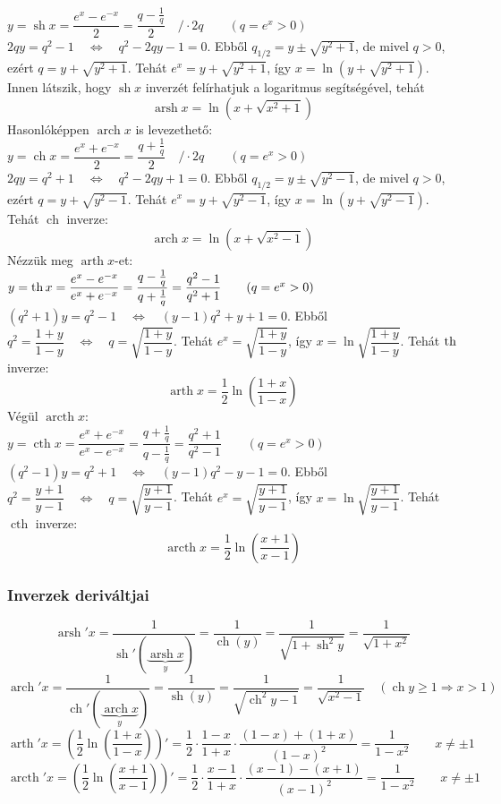 \documentclass[a4paper,12pt,twoside]{book}
\DeclareMathOperator{\sh}{sh} %
\DeclareMathOperator{\ch}{ch} %
\renewcommand{\th}{\qopname\relax o{th}}
\DeclareMathOperator{\cth}{cth}
\DeclareMathOperator{\arsh}{arsh}
\DeclareMathOperator{\arch}{arch}
\DeclareMathOperator{\arth}{arth}
\DeclareMathOperator{\arcth}{arcth}
\theoremstyle{break}
\theoremstyle{plain}
\begin{document}
$y = \sh x = \dfrac{e^x-e^{-x}}{2} = \dfrac{q-\frac{1}{q}}{2} \quad /\cdot 2q \qquad (q=e^x >0)$\\
$2qy = q^2-1 \quad \Leftrightarrow \quad q^2-2qy-1=0$. Ebből $q_{1/2} = y\pm\sqrt{y^2+1}$, de mivel $q>0$, ezért $q=y+\sqrt{y^2+1}$. Tehát $e^x = y+\sqrt{y^2+1}$, így $x = \ln(y+\sqrt{y^2+1})$.\\
Innen látszik, hogy $\sh x$ inverzét felírhatjuk a logaritmus segítségével, tehát
\[\arsh x = \ln(x+\sqrt{x^2+1})\]
Hasonlóképpen $\arch x$ is levezethető:\\
$y = \ch x = \dfrac{e^x+e^{-x}}{2} = \dfrac{q+\frac{1}{q}}{2} \quad /\cdot 2q \qquad (q=e^x >0)$\\
$2qy = q^2+1 \quad \Leftrightarrow \quad q^2-2qy+1=0$. Ebből $q_{1/2} = y\pm\sqrt{y^2-1}$, de mivel $q>0$, ezért $q=y+\sqrt{y^2-1}$. Tehát $e^x = y+\sqrt{y^2-1}$, így $x = \ln(y+\sqrt{y^2-1})$. Tehát $\ch$ inverze:\\
\[\arch x = \ln(x + \sqrt{x^2-1})\]
Nézzük meg $\arth x$-et:\\
$y = \th x = \dfrac{e^x-e^{-x}}{e^x+e^{-x}} = \dfrac{q-\frac{1}{q}}{q+\frac{1}{q}} = \dfrac{q^2-1}{q^2+1} \qquad (q=e^x >0)$\\
$(q^2+1)y = q^2-1 \quad \Leftrightarrow \quad (y-1)q^2+y+1=0$. Ebből $q^2 = \dfrac{1+y}{1-y} \quad \Leftrightarrow \quad q=\sqrt{\dfrac{1+y}{1-y}}$. Tehát $e^x = \sqrt{\dfrac{1+y}{1-y}}$, így $x = \ln \sqrt{\dfrac{1+y}{1-y}}$. Tehát $\th$ inverze:\\
\[\arth x = \frac{1}{2} \ln \left(\frac{1+x}{1-x}\right)\]
Végül $\arcth x$:\\
$y = \cth x = \dfrac{e^x+e^{-x}}{e^x-e^{-x}} = \dfrac{q+\frac{1}{q}}{q-\frac{1}{q}} = \dfrac{q^2+1}{q^2-1} \qquad (q=e^x >0)$\\
$(q^2-1)y = q^2+1 \quad \Leftrightarrow \quad (y-1)q^2-y-1=0$. Ebből $q^2 = \dfrac{y+1}{y-1} \quad \Leftrightarrow \quad q=\sqrt{\dfrac{y+1}{y-1}}$. Tehát $e^x = \sqrt{\dfrac{y+1}{y-1}}$, így $x = \ln \sqrt{\dfrac{y+1}{y-1}}$. Tehát $\cth$ inverze:\\
\[\arcth x = \frac{1}{2} \ln \left(\frac{x+1}{x-1}\right)\]

\subsubsection{Inverzek deriváltjai}

\[\arsh' x = \frac{1}{\sh'(\underbrace{\arsh x}_{y})} = \frac{1}{\ch(y)} = \frac{1}{\sqrt{1+\sh^2 y}} = \frac{1}{\sqrt{1+x^2}}\]
\[\arch' x = \frac{1}{\ch'(\underbrace{\arch x}_{y})} = \frac{1}{\sh(y)} = \frac{1}{\sqrt{\ch^2 y-1}} = \frac{1}{\sqrt{x^2-1}} \quad (\ch y\geqslant 1 \Rightarrow x>1)\]
\[\arth' x = \left(\frac{1}{2} \ln\left(\frac{1+x}{1-x}\right)\right)' = \frac{1}{2}\cdot \frac{1-x}{1+x}\cdot \frac{(1-x)+(1+x)}{(1-x)^2} = \frac{1}{1-x^2} \qquad x\neq \pm 1\]
\[\arcth' x = \left(\frac{1}{2} \ln\left(\frac{x+1}{x-1}\right)\right)' = \frac{1}{2}\cdot \frac{x-1}{1+x}\cdot \frac{(x-1)-(x+1)}{(x-1)^2} = \frac{1}{1-x^2} \qquad x\neq \pm 1\]
\end{document}
